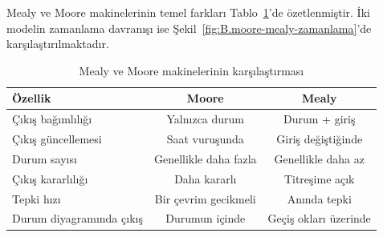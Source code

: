 Mealy ve Moore makinelerinin temel farkları Tablo~\ref{tab:B.moore-mealy}'de özetlenmiştir. İki modelin zamanlama davranışı ise Şekil~\ref{fig:B.moore-mealy-zamanlama}'de karşılaştırılmaktadır.

\begin{table}[H]
\centering
\caption{Mealy ve Moore makinelerinin karşılaştırması}
\label{tab:B.moore-mealy}
\begin{tabular}{lcc}
\toprule
\textbf{Özellik} & \textbf{Moore} & \textbf{Mealy} \\
\midrule
Çıkış bağımlılığı & Yalnızca durum & Durum + giriş \\
Çıkış güncellemesi & Saat vuruşunda & Giriş değiştiğinde \\
Durum sayısı & Genellikle daha fazla & Genellikle daha az \\
Çıkış kararlılığı & Daha kararlı & Titreşime açık \\
Tepki hızı & Bir çevrim gecikmeli & Anında tepki \\
Durum diyagramında çıkış & Durumun içinde & Geçiş okları üzerinde \\
\bottomrule
\end{tabular}
\end{table}


